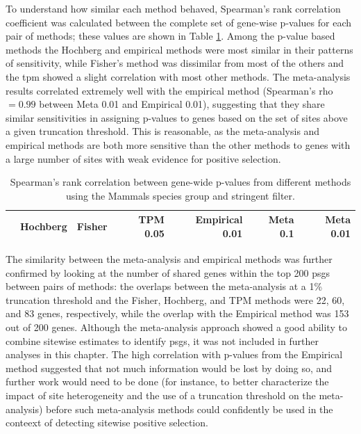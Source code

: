 To understand how similar each method behaved, Spearman's rank
correlation coefficient was calculated between the complete set of
gene-wise p-values for each pair of methods; these values are shown in
Table \ref{table_pval_corrs}. Among the p-value based methods the
Hochberg and empirical methods were most similar in their patterns of
sensitivity, while Fisher's method was dissimilar from most of the
others and the \ac{tpm} showed a slight correlation with most other
methods. The meta-analysis results correlated extremely well with the
empirical method (Spearman's rho$=0.99$ between Meta 0.01 and
Empirical 0.01), suggesting that they share similar sensitivities in
assigning p-values to genes based on the set of sites above a given
truncation threshold. This is reasonable, as the meta-analysis and
empirical methods are both more sensitive than the other methods to
genes with a large number of sites with weak evidence for positive
selection.

\begin{table}
\centering
\begin{tabular}{rrrrrrr}
\toprule
 & Hochberg & Fisher & TPM 0.05 & Empirical 0.01 & Meta 0.1 & Meta 0.01 \\

\midrule



\bottomrule
\end{tabular}
\caption{Spearman's rank correlation between gene-wide p-values from
  different methods using the Mammals species group and stringent
  filter.}
\label{table_pval_corrs}
\end{table}

The similarity between the meta-analysis and empirical methods was
further confirmed by looking at the number of shared genes within the
top 200 \acp{psg} between pairs of methods: the overlaps between the
meta-analysis at a 1\% truncation threshold and the Fisher, Hochberg,
and TPM methods were 22, 60, and 83 genes, respectively, while the
overlap with the Empirical method was 153 out of 200 genes. Although
the meta-analysis approach showed a good ability to combine sitewise
estimates to identify \acp{psg}, it was not included in further
analyses in this chapter. The high correlation with p-values from the
Empirical method suggested that not much information would be lost by
doing so, and further work would need to be done (for instance, to
better characterize the impact of site heterogeneity and the use of a
truncation threshold on the meta-analysis) before such meta-analysis
methods could confidently be used in the conteext of detecting
sitewise positive selection.

